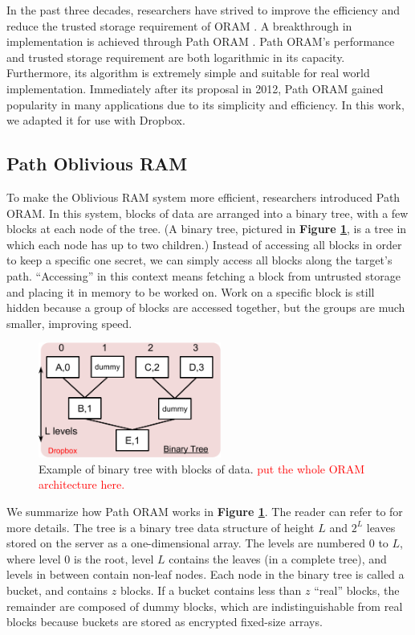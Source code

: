 \documentclass[conference]{IEEEtran}
\begin{document}
In the past three decades, researchers have strived to improve the efficiency and reduce the trusted storage requirement of ORAM \cite{G87, GM11, O90, SCSL11, SSS12}. A breakthrough in implementation is achieved through Path ORAM \cite{PathORAM}. Path ORAM’s performance and trusted storage requirement are both logarithmic in its capacity. Furthermore, its algorithm is extremely simple and suitable for real world implementation. Immediately after its proposal in 2012, Path ORAM gained popularity in many applications due to its simplicity and efficiency. In this work, we adapted it for use with Dropbox.

\subsection{Path Oblivious RAM}
To make the Oblivious RAM system more efficient, researchers introduced Path ORAM. In this system, blocks of data are arranged into a binary tree, with a few blocks at each node of the tree. (A binary tree, pictured in {\bf Figure \ref{fig:bintree}}, is a tree in which each node has up to two children.) Instead of accessing all blocks in order to keep a specific one secret, we can simply access all blocks along the target’s path. “Accessing” in this context means fetching a block from untrusted storage and placing it in memory to be worked on. Work on a specific block is still hidden because a group of blocks are accessed together, but the groups are much smaller, improving speed. 

\begin{figure}
\begin{center}
  \includegraphics[width=6cm]{220.png}
  \caption{Example of binary tree with blocks of data. \textcolor{red}{put the
  whole ORAM architecture here.}}
  \label{fig:bintree}
\end{center}
\end{figure}

We summarize how Path ORAM works in {\bf Figure \ref{fig:bintree}}. The reader can refer to \cite{PathORAM} for more details. The tree is a binary tree data structure of height $L$ and $2^L$ leaves stored on the server as a one-dimensional array. The levels are numbered 0 to $L$, where level 0 is the root, level $L$ contains the leaves (in a complete tree), and levels in between contain non-leaf nodes. Each node in the binary tree is called a bucket, and contains $z$ blocks. If a bucket contains less than $z$ “real” blocks, the remainder are composed of dummy blocks, which are indistinguishable from real blocks because buckets are stored as encrypted fixed-size arrays.
\end{document}
